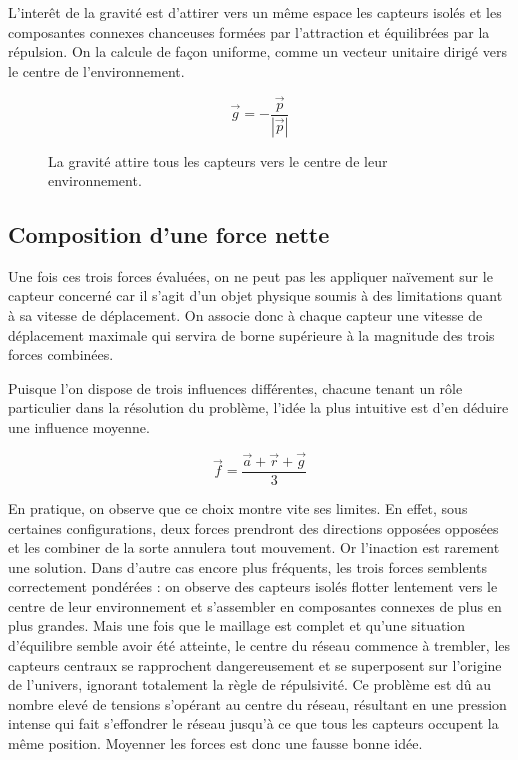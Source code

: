 \documentclass[10pt]{article}
\begin{document}
\begin{multicols}{2}
L'interêt de la gravité est d'attirer vers un même espace les capteurs
isolés et les composantes connexes chanceuses formées par l'attraction
et équilibrées par la répulsion. On la calcule de façon uniforme,
comme un vecteur unitaire dirigé vers le centre de l'environnement.

$$
\vec{g} = -\frac{\vec{p}}{|\vec{p}|}
$$

\begin{figure}[H]

  \centering

  

  \caption{La gravité attire tous les capteurs vers le centre de leur
    environnement.}
  \label{gravite}

\end{figure}

\subsection*{Composition d'une force nette}

Une fois ces trois forces évaluées, on ne peut pas les appliquer
naïvement sur le capteur concerné car il s'agit d'un objet physique
soumis à des limitations quant à sa vitesse de déplacement. On associe
donc à chaque capteur une vitesse de déplacement maximale qui servira
de borne supérieure à la magnitude des trois forces combinées.

Puisque l'on dispose de trois influences différentes, chacune tenant
un rôle particulier dans la résolution du problème, l'idée la plus
intuitive est d'en déduire une influence moyenne.

$$
\vec{f} = \frac{\vec{a} + \vec{r} + \vec{g}}{3}
$$

En pratique, on observe que ce choix montre vite ses limites. En
effet, sous certaines configurations, deux forces prendront des
directions opposées opposées et les combiner de la sorte annulera tout
mouvement. Or l'inaction est rarement une solution. Dans d'autre cas
encore plus fréquents, les trois forces semblents correctement
pondérées : on observe des capteurs isolés flotter lentement vers le
centre de leur environnement et s'assembler en composantes connexes de
plus en plus grandes. Mais une fois que le maillage est complet et
qu'une situation d'équilibre semble avoir été atteinte, le centre du
réseau commence à trembler, les capteurs centraux se rapprochent
dangereusement et se superposent sur l'origine de l'univers, ignorant
totalement la règle de répulsivité. Ce problème est dû au nombre elevé
de tensions s'opérant au centre du réseau, résultant en une pression
intense qui fait s'effondrer le réseau jusqu'à ce que tous les
capteurs occupent la même position. Moyenner les forces est donc une
fausse bonne idée.


\end{multicols}
\end{document}

